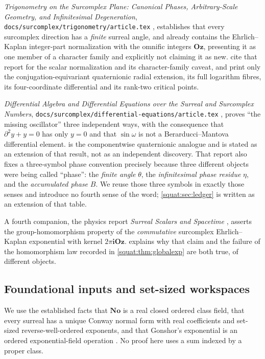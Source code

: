 \documentclass[11pt,letterpaper]{article}
\numberwithin{equation}{section}
\theoremstyle{definition}
\theoremstyle{remark}
\newcommand{\No}{\mathbf{No}}
\newcommand{\Oz}{\mathbf{Oz}}
\newcommand{\ii}{\mathbf i}
\begin{document}
\emph{Trigonometry on the Surcomplex Plane: Canonical Phases, Arbitrary-Scale Geometry,
and Infinitesimal Degeneration}, \texttt{docs/surcomplex/trigonometry/article.tex}
\cite{RepoTrig}, establishes that every surcomplex direction has a \emph{finite} surreal
angle, and already contains the Ehrlich--Kaplan integer-part normalization with the
omnific integers $\Oz$, presenting it as one member of a character family and explicitly
not claiming it as new.  cite that report
for the scalar normalization and its character-family caveat, and print only the
conjugation-equivariant quaternionic radial extension, its full logarithm fibres, its
four-coordinate differential and its rank-two critical points.

\emph{Differential Algebra and Differential Equations over the Surreal and Surcomplex
Numbers}, \texttt{docs/surcomplex/differential-equations/article.tex} \cite{RepoDiff},
proves ``the missing oscillator'' three independent ways, with the consequence that
$\partial^2y+y=0$ has only $y=0$ and that $\sin\omega$ is not a Berarducci--Mantova
differential element.  is the componentwise quaternionic
analogue and is stated as an extension of that result, not as an independent discovery.
That report also fixes a three-symbol phase convention precisely because three different
objects were being called ``phase'': the \emph{finite angle} $\theta$, the
\emph{infinitesimal phase residue} $\eta$, and the \emph{accumulated phase} $B$. We
reuse those three symbols in exactly those senses and introduce no fourth sense of the
word; \cref{squat:sec:ledger} is written as an extension of that table.

A fourth companion, the physics report \emph{Surreal Scalars and Spacetime}
\cite{RepoPhys}, asserts the group-homomorphism property of the \emph{commutative}
surcomplex Ehrlich--Kaplan exponential with kernel $2\pi\ii\Oz$.
 explains why that claim and the failure of the homomorphism
law recorded in \cref{squat:thm:globalexp} are both true, of different objects.

\subsection{Foundational inputs and set-sized workspaces}\label{squat:sub:foundations}
We use the established facts that $\No$ is a real closed ordered class field, that every
surreal has a unique Conway normal form with real coefficients and set-sized
reverse-well-ordered exponents, and that Gonshor's exponential is an ordered
exponential-field operation \cite{Conway,Gonshor,vdDE,EK}. No proof here uses a sum
indexed by a proper class.
\end{document}
